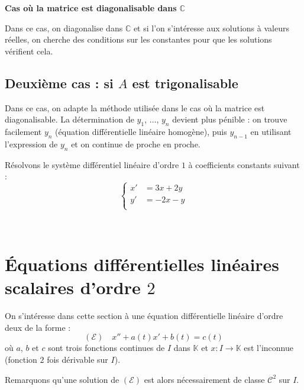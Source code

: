 \documentclass[a4paper,10pt]{report}
\begin{document}
\noindent \textbf{Cas où la matrice est diagonalisable dans $\mathbb{C}$} 

\noindent Dans ce cas, on diagonalise dans $\mathbb{C}$ et si l'on s'intéresse aux solutions à valeurs réelles, on cherche des conditions sur les constantes pour que les solutions vérifient cela.

\subsection{Deuxième cas : si $A$ est trigonalisable}

\noindent Dans ce cas, on adapte la méthode utilisée dans le cas où la matrice est diagonalisable. La détermination de $y_1$, $\ldots$, $y_n$ devient plus pénible : on trouve facilement $y_n$ (équation différentielle linéaire homogène), puis $y_{n-1}$ en utilisant l'expression de $y_n$ et on continue de proche en proche. 

\medskip

\begin{ex} Résolvons le système différentiel linéaire d'ordre $1$ à coefficients constants suivant : 
$$ \left\lbrace \begin{array}{lll}
    x' & = 3x + 2y \\
    y' & = -2x - y \\
    \end{array}\right.$$
\end{ex}

\vspace{10cm}

\newpage

$\phantom{test}$

\vspace{6cm}
\section{Équations différentielles linéaires scalaires d'ordre $2$}

\noindent On s'intéresse dans cette section à une équation différentielle linéaire d'ordre deux de la forme :
$$ (\mathcal{E}) \quad x''+a(t)x'+b(t)=c(t)$$
où $a$, $b$ et $c$ sont trois fonctions continues de $I$ dans $\mathbb{K}$ et $x : I \rightarrow \mathbb{K}$ est l'inconnue (fonction $2$ fois dérivable sur $I$).

\medskip

\noindent Remarquons qu'une solution de $(\mathcal{E})$ est alors nécessairement de classe $\mathcal{C}^2$ sur $I$.
\end{document}
